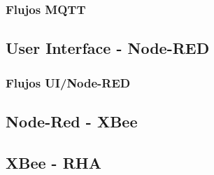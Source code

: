 \subsubsection{Flujos MQTT}

\subsection{User Interface - Node-RED}

\subsubsection{Flujos UI/Node-RED}

\subsection{Node-Red - XBee}\label{subsec:NR-Xbee}

\subsection{XBee - RHA}
